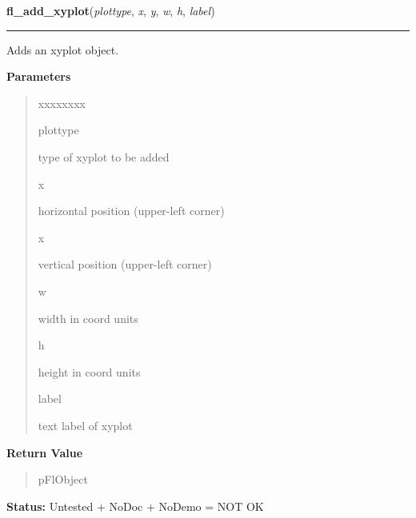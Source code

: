    \vspace{0.5ex}

\hspace{.8\funcindent}\begin{boxedminipage}{\funcwidth}

    \raggedright \textbf{fl\_add\_xyplot}(\textit{plottype}, \textit{x}, \textit{y}, \textit{w}, \textit{h}, \textit{label})

    \vspace{-1.5ex}

    \rule{\textwidth}{0.5\fboxrule}
\setlength{\parskip}{2ex}
    Adds an xyplot object.

\setlength{\parskip}{1ex}
      \textbf{Parameters}
      \vspace{-1ex}

      \begin{quote}
        \begin{Ventry}{xxxxxxxx}

          \item[plottype]

          type of xyplot to be added

          \item[x]

          horizontal position (upper-left corner)

          \item[x]

          vertical position (upper-left corner)

          \item[w]

          width in coord units

          \item[h]

          height in coord units

          \item[label]

          text label of xyplot

        \end{Ventry}

      \end{quote}

      \textbf{Return Value}
    \vspace{-1ex}

      \begin{quote}
      pFlObject

      \end{quote}

\textbf{Status:} Untested + NoDoc + NoDemo = NOT OK



    \end{boxedminipage}

